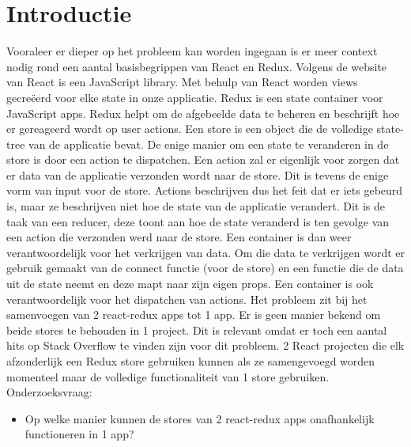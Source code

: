 
\section{Introductie} %
\label{sec:introductie}
Vooraleer er dieper op het probleem kan worden ingegaan is er meer context nodig rond een aantal basisbegrippen van React en Redux.
Volgens de website van \textcite{Redux02}
React is een JavaScript library. Met behulp van React worden views gecreëerd voor elke state in onze applicatie. 
Redux is een state container voor JavaScript apps. Redux helpt om de afgebeelde data te beheren en beschrijft hoe er gereageerd wordt op user actions.  
Een store is een object die de volledige state-tree van de applicatie bevat. De enige manier om een state te veranderen in de store is door een action te dispatchen.
Een action zal er eigenlijk voor zorgen dat er data van de applicatie verzonden wordt naar de store. Dit is tevens de enige vorm van input voor de store. Actions beschrijven dus het feit dat er iets gebeurd is, maar ze beschrijven niet hoe de state van de applicatie verandert. Dit is de taak van een reducer, deze toont aan hoe de state veranderd is ten gevolge van een action die verzonden werd naar de store. Een container is dan weer verantwoordelijk voor het verkrijgen van data. Om die data te verkrijgen wordt er gebruik gemaakt van de connect functie (voor de store) en een functie die de data uit de state neemt en deze mapt naar zijn eigen props. Een container is ook verantwoordelijk voor het dispatchen van actions.  
Het probleem zit bij het samenvoegen van 2 react-redux apps tot 1 app. Er is geen manier bekend om beide stores te behouden in 1 project. Dit is relevant omdat er toch een aantal hits op Stack Overflow te vinden zijn voor dit probleem. 
2 React projecten die elk afzonderlijk een Redux store gebruiken kunnen als ze samengevoegd worden momenteel maar de volledige functionaliteit van 1 store gebruiken.  
Onderzoeksvraag: 


\begin{itemize}
	\item Op welke manier kunnen de stores van 2 react-redux apps onafhankelijk functioneren in 1 app? 
	
\end{itemize}




